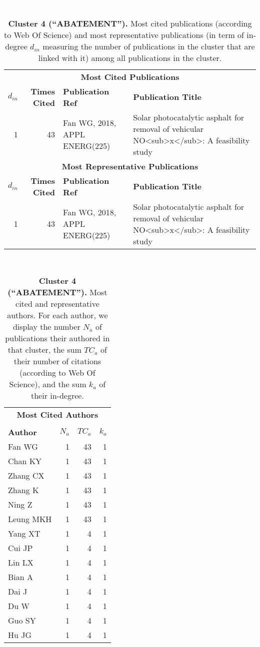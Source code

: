 \documentclass[a4paper,11pt]{report}
\begin{document}
\begin{landscape}
\clearpage

\begin{table}[!ht]
\caption*{{\bf Cluster 4 (``ABATEMENT'').} Most cited publications (according to Web Of Science) and most representative publications (in term of in-degree $d_{in}$ measuring the number of publications in the cluster that are linked with it) among all publications in the cluster.}
\textcolor{white}{aa}\\
{\scriptsize\begin{tabular}{|r r p{7cm} p{17cm}|}
\hline
\multicolumn{4}{|c|}{{\bf Most Cited Publications}}\\
{\bf $d_{in}$} & {\bf Times Cited} & {\bf Publication Ref} & {\bf Publication Title} \\
1 & 43 & Fan WG, 2018, APPL ENERG(225) & Solar photocatalytic asphalt for removal of vehicular NO<sub>x</sub>: A feasibility study\\
\hline
\hline
\multicolumn{4}{|c|}{{\bf Most Representative Publications}}\\
{\bf $d_{in}$} & {\bf Times Cited} & {\bf Publication Ref} & {\bf Publication Title} \\
1 & 43 & Fan WG, 2018, APPL ENERG(225) & Solar photocatalytic asphalt for removal of vehicular NO<sub>x</sub>: A feasibility study\\
\hline
\end{tabular}
}
\end{table}

\clearpage

\begin{table}[!ht]
\caption*{{\bf Cluster 4 (``ABATEMENT'').} Most cited and representative authors. For each author, we display the number $N_a$ of publications their authored in that cluster, the sum $TC_a$ of their number of citations (according to Web Of Science), and the sum $k_a$ of their in-degree. }
\textcolor{white}{aa}\\
{\scriptsize\begin{tabular}{|l r r r|}
\hline
\multicolumn{4}{|c|}{{\bf Most Cited Authors}}\\
&&&\\
{\bf Author} & {\bf $N_a$} & {\bf $TC_a$} & {\bf $k_a$}\\
Fan WG & 1 & 43 & 1 \\
Chan KY & 1 & 43 & 1 \\
Zhang CX & 1 & 43 & 1 \\
Zhang K & 1 & 43 & 1 \\
Ning Z & 1 & 43 & 1 \\
Leung MKH & 1 & 43 & 1 \\
Yang XT & 1 & 4 & 1 \\
Cui JP & 1 & 4 & 1 \\
Lin LX & 1 & 4 & 1 \\
Bian A & 1 & 4 & 1 \\
Dai J & 1 & 4 & 1 \\
Du W & 1 & 4 & 1 \\
Guo SY & 1 & 4 & 1 \\
Hu JG & 1 & 4 & 1 \\
\hline


\end{tabular}}
\end{table}
\end{landscape}
\end{document}
